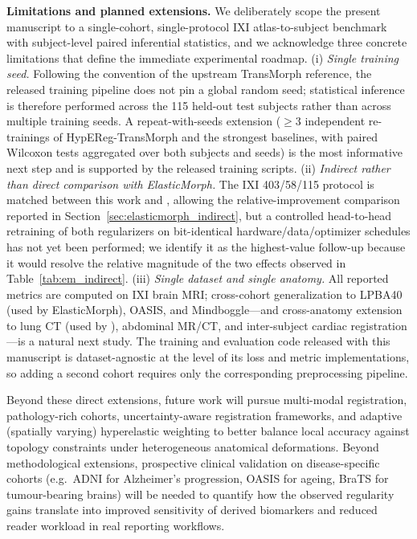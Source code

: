 \documentclass[jimaging,article,submit,pdftex,moreauthors]{Definitions/mdpi}
\begin{document}
\noindent\textbf{Limitations and planned extensions.}\label{sec:limitations}
We deliberately scope the present manuscript to a single-cohort, single-protocol IXI atlas-to-subject benchmark with subject-level paired inferential statistics, and we acknowledge three concrete limitations that define the immediate experimental roadmap. (i) \emph{Single training seed.} Following the convention of the upstream TransMorph reference, the released training pipeline does not pin a global random seed; statistical inference is therefore performed across the 115 held-out test subjects rather than across multiple training seeds. A repeat-with-seeds extension ($\geq 3$ independent re-trainings of HypEReg-TransMorph and the strongest baselines, with paired Wilcoxon tests aggregated over both subjects and seeds) is the most informative next step and is supported by the released training scripts. (ii) \emph{Indirect rather than direct comparison with ElasticMorph.} The IXI 403/58/115 protocol is matched between this work and \cite{elasticmorph2025}, allowing the relative-improvement comparison reported in Section~\ref{sec:elasticmorph_indirect}, but a controlled head-to-head retraining of both regularizers on bit-identical hardware/data/optimizer schedules has not yet been performed; we identify it as the highest-value follow-up because it would resolve the relative magnitude of the two effects observed in Table~\ref{tab:em_indirect}. (iii) \emph{Single dataset and single anatomy.} All reported metrics are computed on IXI brain MRI; cross-cohort generalization to LPBA40 (used by ElasticMorph), OASIS, and Mindboggle---and cross-anatomy extension to lung CT (used by \cite{hering2021lung,zou2023conformal}), abdominal MR/CT, and inter-subject cardiac registration---is a natural next study. The training and evaluation code released with this manuscript is dataset-agnostic at the level of its loss and metric implementations, so adding a second cohort requires only the corresponding preprocessing pipeline.

Beyond these direct extensions, future work will pursue multi-modal registration, pathology-rich cohorts, uncertainty-aware registration frameworks, and adaptive (spatially varying) hyperelastic weighting to better balance local accuracy against topology constraints under heterogeneous anatomical deformations. Beyond methodological extensions, prospective clinical validation on disease-specific cohorts (e.g.\ ADNI for Alzheimer's progression, OASIS for ageing, BraTS for tumour-bearing brains) will be needed to quantify how the observed regularity gains translate into improved sensitivity of derived biomarkers and reduced reader workload in real reporting workflows.
\end{document}
